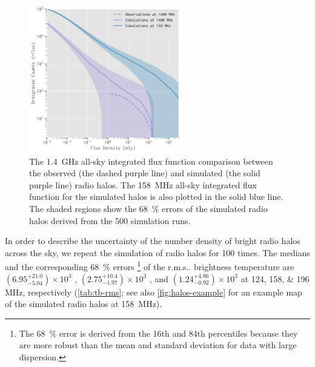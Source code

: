 \documentclass[modern]{aastex62}
\makeatletter
\newcommand{\rms}{r.m.s\@ifnextchar.{}{.\@}}
\makeatother
\begin{document}
\begin{figure}
  \centering
  \includegraphics[width=0.6\textwidth]{fluxfunc-simucomp-1400}
  \caption{\label{fig:halos-simucomp}%
    The \SI{1.4}{\GHz} all-sky integrated flux function comparison
    between the observed (the dashed purple line) and simulated
    (the solid purple line) radio halos.
    The \SI{158}{\MHz} all-sky integrated flux function for the simulated
    halos is also plotted in the solid blue line.
    The shaded regions show the \SI{68}{\percent} errors of the
    simulated radio halos derived from the 500 simulation runs.
  }
\end{figure}

In order to describe the uncertainty of the number density of bright
radio halos across the sky, we repeat the simulation of radio halos
for 100 times.
The medians and the corresponding \SI{68}{\percent} errors%
\footnote{The \SI{68}{\percent} error is derived from the 16th
and 84th percentiles because they are more robust than the mean and
standard deviation for data with large dispersion.}
of the \rms{} brightness temperature are
$\left(6.95_{-5.04}^{+21.0}\right) \times 10^3$ \si{\mK},
$\left(2.75_{-1.97}^{+10.4}\right) \times 10^3$ \si{\mK}, and
$\left(1.24_{-0.92}^{+4.86}\right) \times 10^3$ \si{\mK}
at \numlist{124;158;196} \si{\MHz}, respectively
(\autoref{tab:tb-rms}; see also \autoref{fig:halos-example} for an
example map of the simulated radio halos at \SI{158}{\MHz}).
\end{document}
